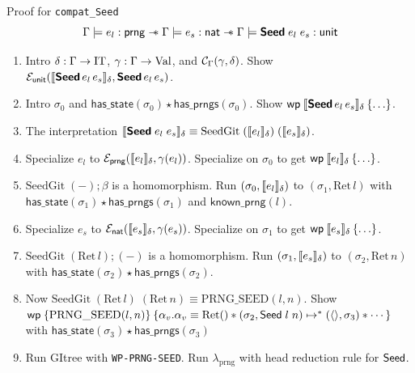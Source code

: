 \documentclass[8pt]{beamer}
\newcommand{\prng}{\mathrm{prng}}
\newcommand{\redu}{\mapsto}
\newcommand{\redus}{\redu^\ast}
\newcommand{\hasstate}{\textsf{has\_state}}
\newcommand{\IT}{\mathrm{IT}}
\newcommand{\gRet}{\mathrm{Ret}}
\newcommand{\knownprng}{\textsf{known\_prng}}
\newcommand{\hasprngs}{\textsf{has\_prngs}}
\begin{document}
   \begin{frame}{Proof for \texttt{compat\_Seed}}
     \[
       {\Gamma}\models{e_l}\mathrel{:}{{ {\mathsf{prng}}}} \mathrel{-\!\!*} {\Gamma}\models{e_s}\mathrel{:}{{ {\mathsf{nat}}}} \mathrel{-\!\!*}
       { {\Gamma}\models{\bm{{ {\mathsf{Seed}}}}\;e_l\;e_s}\mathrel{:}{{ {\mathsf{unit}}}} }
     \]
     \begin{enumerate}[<+->]
       \item Intro \(\senv : \Gamma \to \IT\), \(\gamma : \Gamma \to \mathrm{Val}\), and \(\mathcal{C}_{\Gamma}(\gamma,\delta)\). Show \(\mathcal{E}_{{ {\mathsf{unit}}}}(\llbracket {\bm{{ {\mathsf{Seed}}}}\,e_l\,e_s} \rrbracket_\delta, \bm{{ {\mathsf{Seed}}}}\,e_l\,e_s)\).
       \item Intro \(\sigma_0\) and \(\hasstate(\sigma_0) \star \hasprngs(\sigma_0)\). Show \(\wpre{\sem{\kw{Seed}\,e_l\,e_s}_\senv}{\ldots}\).
       \item The interpretation \(\llbracket {\bm{{ {\mathsf{Seed}}}}\;e_l\;e_s} \rrbracket_\delta\equiv \mathrm{SeedGit}\;(\llbracket {e_l} \rrbracket_\delta)\;(\llbracket {e_s} \rrbracket_\delta)\).
       \item Specialize \(e_l\) to \(\mathcal{E}_{{ {\mathsf{prng}}}}(\llbracket {e_l} \rrbracket_\delta, \gamma(e_l))\).
         Specialize on \(\sigma_0\) to get \(\wpre{\sem{e_l}_\senv}{\ldots}\).
       \item \(\mathrm{SeedGit}\;(-);\beta\) is a homomorphism. Run \((\sigma_0,\llbracket {e_l} \rrbracket_\delta)\) to \((\sigma_1,\gRet\,l)\) with \(\hasstate(\sigma_1)\star \hasprngs(\sigma_1)\) and \(\knownprng(l)\).
       \item Specialize \(e_s\) to \(\mathcal{E}_{{ {\mathsf{nat}}}}(\llbracket {e_s} \rrbracket_\delta, \gamma(e_s))\).
         Specialize on \(\sigma_1\) to get \(\wpre{\sem{e_s}_\senv}{\ldots}\).
       \item \(\mathrm{SeedGit}\;(\gRet\,l);(-)\) is a homomorphism. Run \((\sigma_1,\llbracket {e_s} \rrbracket_\delta)\) to \((\sigma_2,\gRet\,n)\) with \(\hasstate(\sigma_2)\star \hasprngs(\sigma_2)\).
       \item Now \(\mathrm{SeedGit}\;(\gRet\,l)\;(\gRet\,n) \equiv \mathrm{PRNG\_SEED}(l,n)\). Show\\
         \(\wpre{\{\mathrm{PRNG\_SEED}(l,n)\}}{\alpha_v . \alpha_v \equiv \gRet() \star (\sigma_2,\syn{Seed}\;l\;n) \redus (\langle\rangle,\sigma_3) \star \cdots}\)
         with \(\hasstate(\sigma_3)\star\hasprngs(\sigma_3)\)
       \item Run GItree with \texttt{WP-PRNG-SEED}. Run \(\lambda_\prng\) with head reduction rule for \({ {\mathsf{Seed}}}\).
     \end{enumerate}
   \end{frame}
\end{document}
